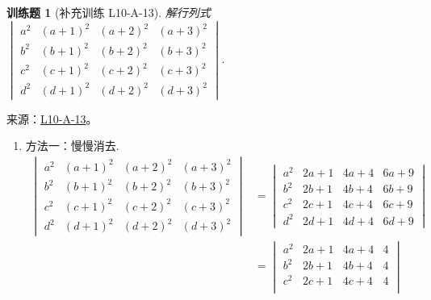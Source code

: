 \documentclass[12pt,fontset=fandol]{ctexart}
\newtheorem{exercise}{训练题}[section]
\begin{document}
\begin{exercise}[补充训练 L10-A-13]\label{prob:L10-A-13}
解行列式 $ \begin{vmatrix}
                a^{2} & (a+1)^{2} & (a+2)^{2} & (a+3)^{2} \\
                b^{2} & (b+1)^{2} & (b+2)^{2} & (b+3)^{2} \\
                c^{2} & (c+1)^{2} & (c+2)^{2} & (c+3)^{2} \\
                d^{2} & (d+1)^{2} & (d+2)^{2} & (d+3)^{2}
            \end{vmatrix} $.
\end{exercise}
\noindent 来源：\href{https://github.com/yhwu-is/Linear-Algebra-Left-Undone/blob/new/%E8%AE%B2%E4%B9%89/%E4%B8%93%E9%A2%98/10%20%E8%A1%8C%E5%88%97%E5%BC%8F.tex}{L10-A-13}。
\begin{solve}
\begin{enumerate}
                \item 方法一：慢慢消去.
                      \begin{align*}
                          \begin{vmatrix}
                              a^{2} & (a+1)^{2} & (a+2)^{2} & (a+3)^{2} \\
                              b^{2} & (b+1)^{2} & (b+2)^{2} & (b+3)^{2} \\
                              c^{2} & (c+1)^{2} & (c+2)^{2} & (c+3)^{2} \\
                              d^{2} & (d+1)^{2} & (d+2)^{2} & (d+3)^{2}
                          \end{vmatrix}
                           & = \begin{vmatrix}
                                   a^{2} & 2a+1 & 4a+4 & 6a+9 \\
                                   b^{2} & 2b+1 & 4b+4 & 6b+9 \\
                                   c^{2} & 2c+1 & 4c+4 & 6c+9 \\
                                   d^{2} & 2d+1 & 4d+4 & 6d+9
                               \end{vmatrix} \\
                           & = \begin{vmatrix}
                                   a^{2} & 2a+1 & 4a+4 & 4 \\
                                   b^{2} & 2b+1 & 4b+4 & 4 \\
                                   c^{2} & 2c+1 & 4c+4 & 4 \\

\end{vmatrix}
\end{align*}
\end{enumerate}
\end{solve}
\end{document}
